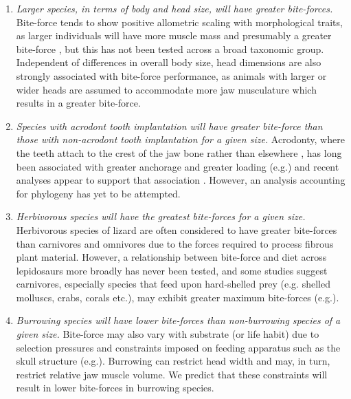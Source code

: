 \documentclass[a4paper, 12pt]{article}
\begin{document}
\begin{enumerate}

\item \textit{Larger species, in terms of body and head size, will have greater bite-forces.} 
Bite-force tends to show positive allometric scaling with morphological traits, as larger individuals will have more muscle mass and presumably a greater bite-force \cite{aguirre2002ecomorphological,herrel2004omnivory,lailvaux2004performance,vanhooydonck2005does,MEASEY2009217}, but this has not been tested across a broad taxonomic group. 
Independent of differences in overall body size, head dimensions are also strongly associated with bite-force performance\cite{kaliontzopoulou2012relationships,jones2020reproductive}, as animals with larger or wider heads are assumed to accommodate more jaw musculature which results in a greater bite-force\cite{herrel1999morphology,huyghe2005morphology}.

\item \textit{Species with acrodont tooth implantation will have greater bite-force than those with non-acrodont tooth implantation for a given size.} 
Acrodonty, where the teeth attach to the crest of the jaw bone rather than elsewhere \cite{smith1958evolutionary}, has long been associated with greater anchorage and greater loading (e.g.\cite{smith1958evolutionary,jones2008skull}) and recent analyses appear to support that association \cite{jenkins2020bite}.
However, an analysis accounting for phylogeny has yet to be attempted.

\item \textit{Herbivorous species will have the greatest bite-forces for a given size.}
Herbivorous species of lizard are often considered to have greater bite-forces than carnivores and omnivores due to the forces required to process fibrous plant material\cite{cooper2002distribution,herrel1999morphology,metzger2005correlations,herrel2004omnivory,Herrel2008}.
However, a relationship between bite-force and diet across lepidosaurs more broadly has never been tested, and some studies suggest carnivores, especially species that feed upon hard-shelled prey (e.g. shelled molluscs, crabs, corals etc.), may exhibit greater maximum bite-forces (e.g.\cite{schaerlaeken2012built}).

\item \textit{Burrowing species will have lower bite-forces than non-burrowing species of a given size.}
Bite-force may also vary with substrate (or life habit) due to selection pressures and constraints imposed on feeding apparatus such as the skull structure (e.g.\cite{gray2019evolution}).
Burrowing can restrict head width\cite{vanhooydonck2011push} and may, in turn, restrict relative jaw muscle volume. We predict that these constraints will result in lower bite-forces in burrowing species. 

\end{enumerate}
\end{document}

